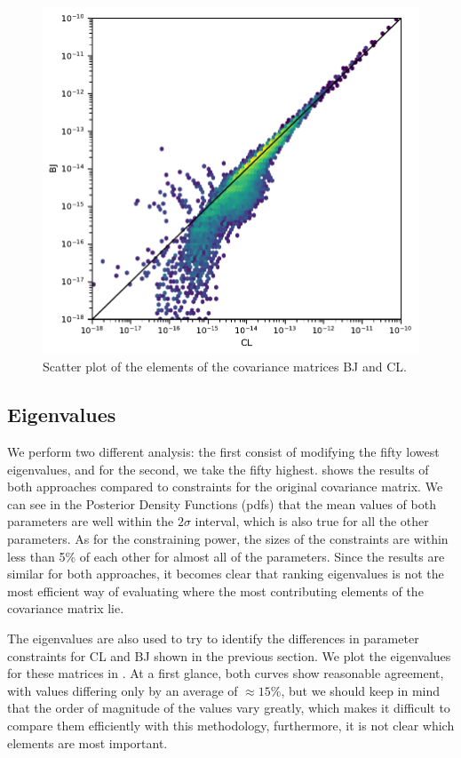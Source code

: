 \documentclass[twocolumn]{\docclass}
\begin{document}
	\begin{figure}
		\includegraphics[width=0.9\columnwidth]{One-to-one-Y3_BJ-CL.pdf}
		\caption{Scatter plot of the elements of the covariance matrices BJ and CL.
			\label{fig:one-to-one}}
	\end{figure}
	
	
	\subsection{Eigenvalues}
	
	We perform two different analysis: the first consist of modifying the fifty lowest eigenvalues, and for the second, we take the fifty highest.   shows the results of both approaches compared to constraints for the original covariance matrix. We can see in the Posterior Density Functions (pdfs) that the mean values of both parameters are well within the $2\sigma$ interval, which is also true for all the other parameters. As for the constraining power, the sizes of the constraints are within less than 5\% of each other for almost all of the parameters. Since the results are similar for both approaches, it becomes clear that ranking eigenvalues is not the most efficient way of evaluating where the most contributing elements of the covariance matrix lie.
	
	The eigenvalues are also used to try to identify the differences in parameter constraints for CL and BJ shown in the previous section. We plot the eigenvalues for these matrices in . At a first glance, both curves show reasonable agreement, with values differing only by an average of $\approx 15\%$, but we should keep in mind that the order of magnitude of the values vary greatly, which makes it difficult to compare them efficiently with this methodology, furthermore, it is not clear which elements are most important.
	
\end{document}
